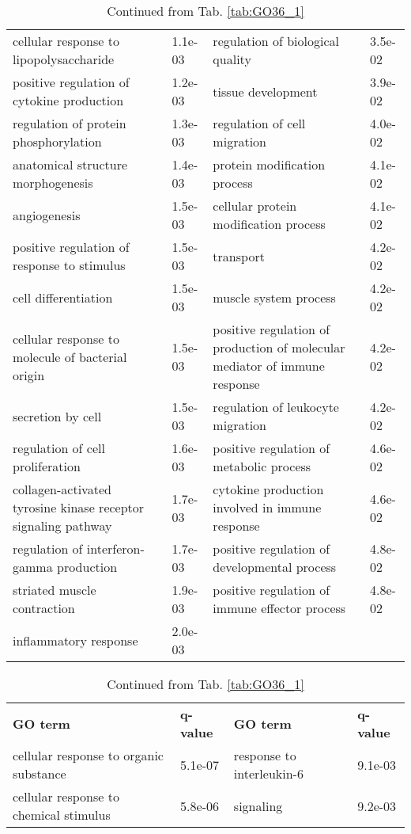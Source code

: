 \documentclass[fleqn,10pt]{SelfArx} %
\begin{document}
\begin{table}[!htb]
\begin{tabularx}{\textwidth}{XlXl}
		cellular response to lipopolysaccharide & 1.1e-03 & regulation of biological quality & 3.5e-02 \\ 
		positive regulation of cytokine production & 1.2e-03 & tissue development & 3.9e-02 \\ 
		regulation of protein phosphorylation & 1.3e-03 & regulation of cell migration & 4.0e-02 \\ 
		anatomical structure morphogenesis & 1.4e-03 & protein modification process & 4.1e-02 \\ 
		angiogenesis & 1.5e-03 & cellular protein modification process & 4.1e-02 \\ 
		positive regulation of response to stimulus & 1.5e-03 & transport & 4.2e-02 \\ 
		cell differentiation & 1.5e-03 & muscle system process & 4.2e-02 \\ 
		cellular response to molecule of bacterial origin & 1.5e-03 & positive regulation of production of molecular mediator of immune response & 4.2e-02 \\ 
		secretion by cell & 1.5e-03 & regulation of leukocyte migration & 4.2e-02 \\ 
		regulation of cell proliferation & 1.6e-03 & positive regulation of metabolic process & 4.6e-02 \\ 
		collagen-activated tyrosine kinase receptor signaling pathway & 1.7e-03 & cytokine production involved in immune response & 4.6e-02 \\ 
		regulation of interferon-gamma production & 1.7e-03 & positive regulation of developmental process & 4.8e-02 \\ 
		striated muscle contraction & 1.9e-03 & positive regulation of immune effector process & 4.8e-02 \\ 
		inflammatory response & 2.0e-03 &  &  \\
	\end{tabularx}
	\smallskip
	\caption{Continued from Tab. \ref{tab:GO36_1}}
	\label{tab:GO36_2}
	\bigskip\bigskip
	\centering
	\scriptsize
	\begin{tabularx}{\textwidth}{XlXl}
		\rowcolor{NavyBlue!80}
		\textbf{\color{white} GO term} & \textbf{\color{white} q-value} & \textbf{\color{white} GO term} & \textbf{\color{white} q-value} \\
		cellular response to organic substance & 5.1e-07 & response to interleukin-6 & 9.1e-03 \\ 
		cellular response to chemical stimulus & 5.8e-06 & signaling & 9.2e-03 \\ 

\end{tabularx}
\end{table}
\end{document}
